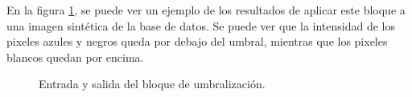 En la figura \ref{ejemploUmbralizacion}, se puede ver un ejemplo de los resultados de aplicar este bloque a una imagen sintética de la base de datos. Se puede ver que la intensidad de los pixeles azules y negros queda por debajo del umbral, mientras que los pixeles blancos quedan por encima. %

\begin{figure}[H]
        \centering
         
  \caption{Entrada y salida del bloque de umbralización.}
      \label{ejemploUmbralizacion}
\end{figure}

